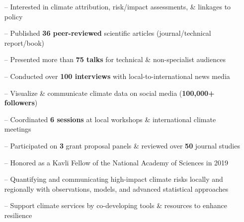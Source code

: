 \documentclass[10pt,letterpaper]{altacv} %
\begin{document}
\tagline{}

%

\begin{fullwidth}
\makecvheader
\end{fullwidth}

%

\vspace{-0.09in}
\begin{itemize}
    \setlength{\itemindent}{0.5em}
    \item[--] \small{Interested in climate attribution, risk\slash impact assessments, \& linkages to policy}
    \item[--] \small{Published \textbf{36 peer-reviewed} scientific articles (journal/technical report/book)}
    \item[--] \small{Presented more than \textbf{75 talks} for technical \& non-specialist audiences}
    \item[--] \small{Conducted over \textbf{100 interviews} with local-to-international news media}
    \item[--] \small{Visualize \& communicate climate data on social media (\textbf{100,000+ followers})}
    \item[--] \small{Coordinated \textbf{6 sessions} at local workshops \& international climate meetings}
    \item[--] \small{Participated on \textbf{3} grant proposal panels \& reviewed over \textbf{50} journal studies}    
    \item[--] \small{Honored as a Kavli Fellow of the National Academy of Sciences in 2019}
\end{itemize}
\smallskip

\vspace*{-0.2cm}

\begin{itemize}
\item[--] \small{Quantifying and communicating high-impact climate risks locally and regionally with observations, models, and advanced statistical approaches}
\item[--] \small{Support climate services by co-developing tools \& resources to enhance resilience}
\end{itemize}
\medskip
\end{document}
